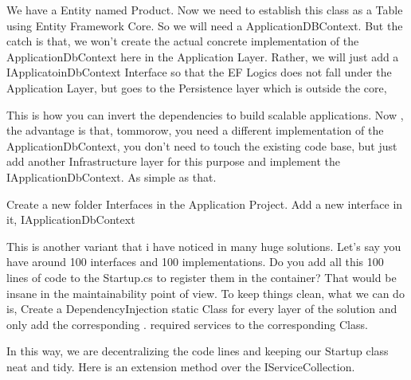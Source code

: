 \documentclass[letterpaper,10pt,english]{sphinxmanual}
\begin{document}
We have a Entity named Product. Now we need to establish this class as a Table using Entity Framework Core. So we will need a ApplicationDBContext. But the catch is that, we won’t create the actual concrete implementation of the ApplicationDbContext here in the Application Layer. Rather, we will just add a IApplicatoinDbContext Interface so that the EF Logics does not fall under the Application Layer, but goes to the Persistence layer which is outside the core,

This is how you can invert the dependencies to build scalable applications. Now , the advantage is that, tommorow, you need a different implementation of the ApplicationDbContext, you don’t need to touch the existing code base, but just add another Infrastructure layer for this purpose and implement the IApplicationDbContext. As simple as that.

Create a new folder Interfaces in the Application Project. Add a new interface in it, IApplicationDbContext

\begin{sphinxVerbatim}[commandchars=\\\{\}]
  
         
     
\end{sphinxVerbatim}

This is another variant that i have noticed in many huge solutions. Let’s say you have around 100 interfaces and 100 implementations. Do you add all this 100 lines of code to the Startup.cs to register them in the container? That would be insane in the maintainability point of view. To keep things clean, what we can do is, Create a DependencyInjection static Class for every layer of the solution and only add the corresponding . required services to the corresponding Class.

In this way, we are decentralizing the code lines and keeping our Startup class neat and tidy. Here is an extension method over the IServiceCollection.

\begin{sphinxVerbatim}[commandchars=\\\{\}]
   
         
\end{sphinxVerbatim}
\end{document}
